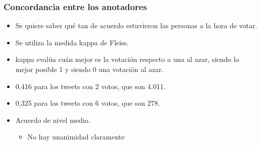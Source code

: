 \begin{frame}[allowframebreaks]
    \frametitle{Concordancia entre los anotadores}

    \begin{itemize}
        \item Se quiere saber qué tan de acuerdo estuvieron las personas a la hora de votar.
        \item Se utiliza la medida kappa de Fleiss.
        \item kappa evalúa cuán mejor es la votación respecto a una al azar, siendo lo mejor posible 1 y siendo 0 una votación al azar.
    \end{itemize}


    \framebreak

    \begin{itemize}
        \item 0,416 para los tweets con 2 votos, que son 4.011.

        \item 0,325 para los tweets con 6 votos, que son 278.

        \item Acuerdo de nivel medio.

        \begin{itemize}
            \item No hay unanimidad claramente
        \end{itemize}
    \end{itemize}
\end{frame}
